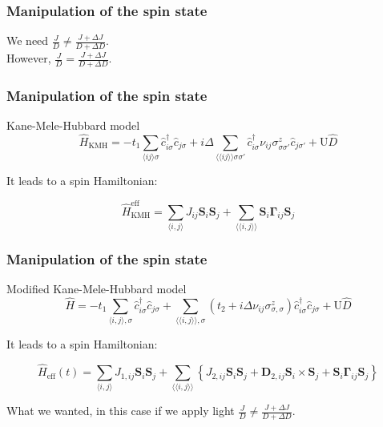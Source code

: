 \documentclass{beamer}
\newcommand{\bs}[1] {\boldsymbol{#1}}
\begin{document}
\begin{frame}
\frametitle{Manipulation of the spin state}
We need $\frac{J}{D} \neq \frac{J+\Delta J}{D+\Delta D}$.
\\[10mm]
However, $\frac{J}{D} = \frac{J+\Delta J}{D+\Delta D}$.
\end{frame}

\begin{frame}
\frametitle{Manipulation of the spin state}
\begin{block}{Kane-Mele-Hubbard model}
\begin{equation}
\hat{H}_{\text{KMH}} = -t_1\sum_{\langle i j \rangle \sigma} \hat{c}^{\dagger}_{i\sigma}\hat{c}_{j\sigma} + i\Delta \sum_{\langle \langle i j \rangle \rangle \sigma \sigma'} \hat{c}^{\dagger}_{i\sigma} \nu_{ij} \sigma^z_{\sigma \sigma'} \hat{c}_{j\sigma'} + \text{U}\hat{D}\nonumber
\end{equation}

It leads to a spin Hamiltonian:

\begin{equation}
\hat{H}_{\text{KMH}}^{\text{eff}} = \sum_{\langle i,j \rangle} J_{ij} \bs{S}_i \bs{S}_j + \sum_{\langle \langle i,j \rangle \rangle} \bs{S}_i \bs{\Gamma}_{ij} \bs{S}_j \nonumber
\end{equation}

\end{block}
\end{frame}

\begin{frame}
\frametitle{Manipulation of the spin state}
\begin{block}{Modified Kane-Mele-Hubbard model}
\begin{equation}
\hat{H} = - t_1\sum_{\langle i,j \rangle, \sigma} \hat{c}_{i \sigma}^\dagger \hat{c}_{j \sigma} + 
	\sum_{\langle \langle i,j \rangle \rangle, \sigma}(t_2 + i\Delta\nu_{ij}\sigma^z_{\sigma, \sigma})\hat{c}_{i \sigma}^\dagger \hat{c}_{j \sigma} + 
	\text{U}\hat{D}\nonumber
\end{equation}

It leads to a spin Hamiltonian:

\begin{equation}
\hat{H}_{\text{eff}}(t) = \sum_{\langle i,j \rangle} J_{1,ij}\bs{S}_i\bs{S}_j + \sum_{\langle \langle i,j \rangle \rangle} \left\{ J_{2,ij}\bs{S}_i\bs{S}_j + \bs{D}_{2,ij} \bs{S}_i \times \bs{S}_j + \bs{S}_i \bs{\Gamma}_{ij} \bs{S}_j \right\} \nonumber
\end{equation}

What we wanted, in this case if we apply light $\frac{J}{D} \neq \frac{J+\Delta J}{D + \Delta D}$.

\end{block}
\end{frame}
\end{document}
